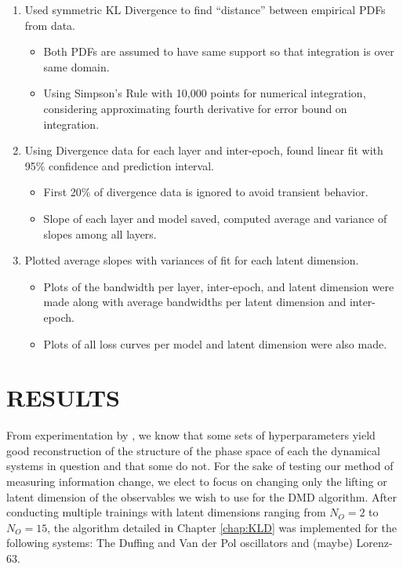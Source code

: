 \begin{enumerate}
  \item Used symmetric KL Divergence to find ``distance'' between empirical PDFs from data.
  \begin{itemize}
    \item Both PDFs are assumed to have same support so that integration is over same domain.
    \item Using Simpson's Rule with 10,000 points for numerical integration, considering approximating 
    fourth derivative for error bound on integration.
  \end{itemize}

  \item Using Divergence data for each layer and inter-epoch, found linear fit with 95\% confidence
  and prediction interval.
  \begin{itemize}
    \item First 20\% of divergence data is ignored to avoid transient behavior.
    \item Slope of each layer and model saved, computed average and variance of slopes among all 
    layers. 
  \end{itemize}

  \item Plotted average slopes with variances of fit for each latent dimension.
  \begin{itemize}
    \item Plots of the bandwidth per layer, inter-epoch, and latent dimension were made along 
    with average bandwidths per latent dimension and inter-epoch.
    \item Plots of all loss curves per model and latent dimension were also made.
  \end{itemize}
\end{enumerate}




\chapter{RESULTS}
\label{chap:results}
From experimentation by \cite{lago}, we know that some sets of hyperparameters yield good reconstruction
of the structure of the phase space of each the dynamical systems in question and that some do not. For
the sake of testing our method of measuring information change, we elect to focus on changing only the 
lifting or latent dimension of the observables we wish to use for the DMD algorithm. After conducting 
multiple trainings with latent dimensions ranging from $N_O = 2$ to $N_O = 15$, the algorithm detailed 
in Chapter \ref{chap:KLD} was implemented for the following systems: The Duffing and Van der Pol oscillators
and (maybe) Lorenz-63.

